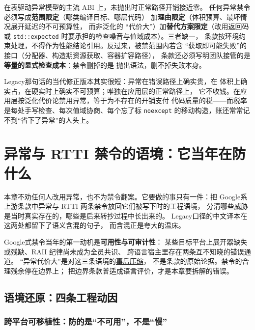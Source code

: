 \documentclass[12pt,a4paper,fontset=fandol]{ctexbook}
\newcommand{\Tp}[1]{\texttt{#1}}
\newcommand{\Lang}[1]{\textsf{#1}}
\newcommand{\DomGo}{\Lang{Google}}
\newcommand{\DomTra}{\Lang{Legacy}}
\begin{document}
\begin{guideline}[title={异常处理条款的正确结构}]
在表驱动异常模型的主流 ABI 上，未抛出时正常路径开销接近零。
任何异常禁令必须写成\textbf{范围限定}（哪类编译目标、哪层代码）
加\textbf{理由限定}（体积预算、最坏情况展开延迟的不可预算性，
而非泛化的 ``代价大''）加\textbf{替代方案限定}（改用返回码或
\Tp{std::expected} 时要承担的检查噪音与值域成本）。三者缺一，
条款按环境约束处理，不得作为性能结论引用。反过来，被禁范围内若含
``获取即可能失败''的接口（分配器、构造期资源获取、容器扩容路径），
条款还必须写明团队接管的是\textbf{等量的显式检查成本}：禁令删掉的是
抛出语法，删不掉失败本身。
\end{guideline}

\DomTra 那句话的当代修正版本其实很短：异常在错误路径上确实贵，在
体积上确实占，在硬实时上确实不可预算；唯独在应用层的正常路径上，
它不收钱。在应用层按泛化代价论禁用异常，等于为不存在的开销支付
代码质量的税——而税率是每处手写检查、每次值域协商、每个忘了标
\Tp{noexcept} 的移动构造，账还常常记不到``省下了异常''的人头上。


\chapter{异常与 RTTI 禁令的语境：它当年在防什么}
\label{ch:ch11-ban}

本章不劝任何人改用异常，也不为禁令翻案。它要做的事只有一件：把
\DomGo 系上游条款中异常与 RTTI 两条禁令放回它们被写下时的工程语境，
分清哪些威胁是当时真实存在的，哪些是后来转抄过程中长出来的。
\DomTra 口径的中文译本在这两处都留下了语义含混的句子，
而含混正是夸大的温床。

\begin{guideline}[title={本章立场}]
\DomGo 式禁令当年的第一动机是\textbf{可用性与可审计性}：
某些目标平台上展开器缺失或残缺、RAII 纪律尚未成为全员共识、
跨语言宿主里存在两条互不知晓的错误通道。
``异常代价大''是对这三条语境的\underline{事后压缩}，
不是条款的原始论据。禁令的合理残余停在边界上；
把边界条款普适成语言评价，才是本章要拆解的错误。
\end{guideline}

\section{语境还原：四条工程动因}
\label{sec:ch11-context}

\subsection{跨平台可移植性：防的是``不可用''，不是``慢''}
\label{ch:ch11-port}
\end{document}
